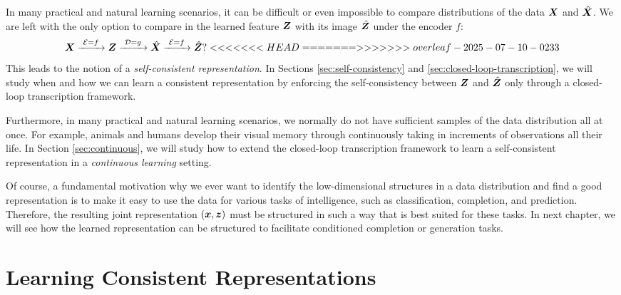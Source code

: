 \documentclass[../../book-main.tex]{subfiles}
\begin{document}
In many practical and natural learning scenarios, it can be difficult or even impossible to compare distributions of the data $\bm{X}$ and $\hat {\bm{X}}$. We are left with the only option to compare in the learned feature $\bm{Z}$ with its image $\hat {\bm{Z}}$ under the encoder $f$: 
\begin{equation}
 \bm{X}
\xrightarrow{\hspace{1mm} \mathcal{E} = f \hspace{1mm}} \bm{Z}  \xrightarrow{\hspace{1mm} \mathcal{D} = g \hspace{1mm}} \hat{\bm{X}} \xrightarrow{\hspace{1mm} \mathcal{E} = f \hspace{1mm}} \hat {\bm{Z}}?
<<<<<<< HEAD
=======
>>>>>>> overleaf-2025-07-10-0233
\end{equation}
This leads to the notion of a {\em self-consistent representation}. In Sections \ref{sec:self-consistency} and \ref{sec:closed-loop-transcription}, we will study when and how we can learn a consistent representation by enforcing the self-consistency between $\bm{Z}$ and $\hat {\bm{Z}}$ only through a closed-loop transcription framework. 

Furthermore, in many practical and natural learning scenarios, we normally do not have sufficient samples of the data distribution all at once. For example, animals and humans develop their visual memory through continuously taking in increments of observations all their life. In Section \ref{sec:continuous}, we will study how to extend the closed-loop transcription framework to learn a self-consistent representation in a  {\em continuous learning} setting.

Of course, a fundamental motivation why we ever want to identify the
low-dimensional structures in a data distribution and find a good
representation is to make it easy to use the data for various tasks
of intelligence, such as classification, completion, and prediction.
Therefore, the resulting joint representation $(\bm{x}, \bm{z})$ must be
structured in such a way that is best suited for these tasks. In
next chapter, we will
see how the learned representation can be structured to facilitate
conditioned completion or generation tasks.

\section{Learning Consistent Representations}\label{sec:consistent-representation}
\end{document}
